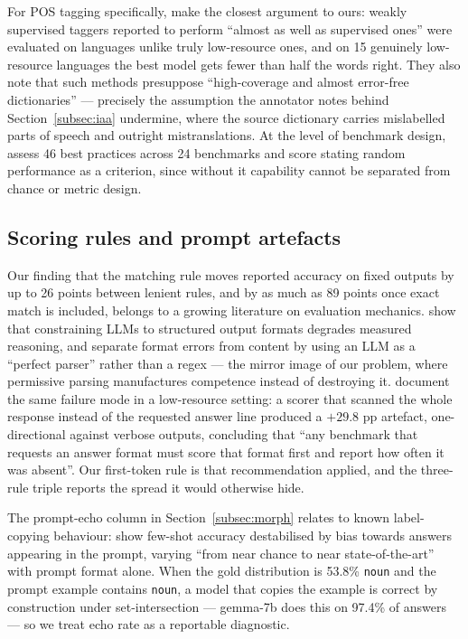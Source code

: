 \documentclass[11pt]{article}
\begin{document}
For POS tagging specifically, \citet{kann-etal-2020-weakly} make the closest
argument to ours: weakly supervised taggers reported to perform ``almost as
well as supervised ones'' were evaluated on languages unlike truly
low-resource ones, and on 15 genuinely low-resource languages the best model
gets fewer than half the words right. They also note that such methods
presuppose ``high-coverage and almost error-free dictionaries'' --- precisely
the assumption the annotator notes behind Section~\ref{subsec:iaa} undermine,
where the source dictionary carries mislabelled parts of speech and outright
mistranslations. At the level of benchmark design,
\citet{reuel-etal-2024-betterbench} assess 46 best practices across 24
benchmarks and score stating random performance as a criterion, since
without it capability cannot be separated from chance or metric design.

\subsection{Scoring rules and prompt artefacts}

Our finding that the matching rule moves reported accuracy on fixed outputs
by up to 26 points between lenient rules, and by as much as 89 points once
exact match is included, belongs to a growing literature on evaluation
mechanics. \citet{tam-etal-2024-speak} show that constraining LLMs to
structured output formats degrades measured reasoning, and separate format
errors from content by using an LLM as a ``perfect parser'' rather than a
regex --- the mirror image of our problem, where permissive parsing
manufactures competence instead of destroying it.
\citet{kirouane-petrocheilos-2026-thinking} document the same failure mode
in a low-resource setting: a scorer that scanned the whole response instead
of the requested answer line produced a $+29.8$ pp artefact, one-directional
against verbose outputs, concluding that ``any benchmark that requests an
answer format must score that format first and report how often it was
absent''. Our first-token rule is that recommendation applied, and the
three-rule triple reports the spread it would otherwise hide.

The prompt-echo column in Section~\ref{subsec:morph} relates to known
label-copying behaviour: \citet{zhao-etal-2021-calibrate} show few-shot
accuracy destabilised by bias towards answers appearing in the prompt,
varying ``from near chance to near state-of-the-art'' with prompt format
alone. When the gold distribution is 53.8\% \texttt{noun} and the prompt
example contains \texttt{noun}, a model that copies the example is correct
by construction under set-intersection --- gemma-7b does this on 97.4\% of
answers --- so we treat echo rate as a reportable diagnostic.
\end{document}
